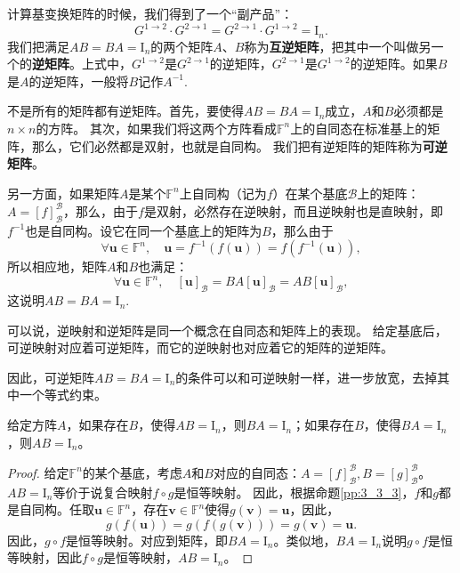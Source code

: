 \documentclass[12pt,UTF8,fontset=none]{ctexbook}
\begin{document}
计算基变换矩阵的时候，我们得到了一个“副产品”：
$$G^{1\rightarrow 2} \cdot G^{2\rightarrow 1} = G^{2\rightarrow 1} \cdot G^{1\rightarrow 2} = \mathrm{I}_n.$$
我们把满足$AB=BA=\mathrm{I}_n$的两个矩阵$A$、$B$称为\textbf{互逆矩阵}，把其中一个叫做另一个的\textbf{逆矩阵}。上式中，$G^{1\rightarrow 2}$是$G^{2\rightarrow 1}$的逆矩阵，$G^{2\rightarrow 1}$是$G^{1\rightarrow 2}$的逆矩阵。如果$B$是$A$的逆矩阵，一般将$B$记作$A^{-1}$.

不是所有的矩阵都有逆矩阵。首先，要使得$AB=BA=\mathrm{I}_n$成立，$A$和$B$必须都是$n\times n$的方阵。
其次，如果我们将这两个方阵看成$\mathbb{F}^n$上的自同态在标准基上的矩阵，那么，它们必然都是双射，也就是自同构。
我们把有逆矩阵的矩阵称为\textbf{可逆矩阵}。

另一方面，如果矩阵$A$是某个$\mathbb{F}^n$上自同构（记为$f$）在某个基底$\mathcal{B}$上的矩阵：$A = [f]_{\mathcal{B}}^{\mathcal{B}}$，那么，由于$f$是双射，必然存在逆映射，而且逆映射也是直映射，即$f^{-1}$也是自同构。设它在同一个基底上的矩阵为$B$，那么由于
$$\forall \mathbf{u} \in \mathbb{F}^n, \quad \mathbf{u} = f^{-1}(f(\mathbf{u})) = f(f^{-1}(\mathbf{u})),$$
所以相应地，矩阵$A$和$B$也满足：
$$\forall \mathbf{u} \in \mathbb{F}^n, \quad [\mathbf{u}]_{\mathcal{B}} = BA[\mathbf{u}]_{\mathcal{B}} = AB[\mathbf{u}]_{\mathcal{B}},$$
这说明$AB=BA=\mathrm{I}_n.$

可以说，逆映射和逆矩阵是同一个概念在自同态和矩阵上的表现。
给定基底后，可逆映射对应着可逆矩阵，而它的逆映射也对应着它的矩阵的逆矩阵。

因此，可逆矩阵$AB=BA=\mathrm{I}_n$的条件可以和可逆映射一样，进一步放宽，去掉其中一个等式约束。

\begin{pp}\label{pp:5_1}
    给定方阵$A$，如果存在$B$，使得$AB = \mathrm{I}_n$，则$BA = \mathrm{I}_n$；如果存在$B$，使得$BA = \mathrm{I}_n$，则$AB = \mathrm{I}_n$。
\end{pp}
\begin{proof} %
给定$\mathbb{F}^n$的某个基底，考虑$A$和$B$对应的自同态：$A = [f]_{\mathcal{B}}^{\mathcal{B}}, B = [g]_{\mathcal{B}}^{\mathcal{B}}$。
$AB = \mathrm{I}_n$等价于说复合映射$f\circ g$是恒等映射。
因此，根据命题\ref{pp:3_3_3}，$f$和$g$都是自同构。任取$\mathbf{u} \in \mathbb{F}^n$，存在$\mathbf{v} \in \mathbb{F}^n$使得$g(\mathbf{v}) = \mathbf{u}$，因此，
$$g(f(\mathbf{u})) = g(f(g(\mathbf{v}))) = g(\mathbf{v}) = \mathbf{u}.$$
因此，$g\circ f$是恒等映射。对应到矩阵，即$BA = \mathrm{I}_n$。类似地，$BA = \mathrm{I}_n$说明$g\circ f$是恒等映射，因此$f\circ g$是恒等映射，$AB = \mathrm{I}_n$。
\end{proof}
\end{document}
